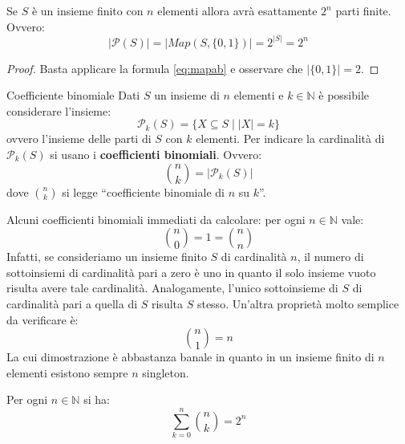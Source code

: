 \begin{corolbox}
	Se $S$ è un insieme finito con $n$ elementi allora avrà esattamente $2^{n}$ parti finite. Ovvero:
	\begin{equation}
		|\mathcal{P}(S)| = |Map(S,\{0,1\})|= 2^{|S|}=2^{n}
	\end{equation}
\end{corolbox}

\begin{proof}
	Basta applicare la formula \ref{eq:mapab} e osservare che $|\{0,1\}|=2$. 
\end{proof}

\begin{defbox}{Coefficiente binomiale}
	Dati $S$ un insieme di $n$ elementi e $k \in \mathbb{N}$ è possibile considerare l'insieme:
	\begin{equation}
		\mathcal{P}_{k}(S)= \{X \subseteq S \; | \; |X| = k\}
	\end{equation}
	ovvero l'insieme delle parti di $S$ con $k$ elementi. Per indicare la cardinalità di $\mathcal{P}_{k}(S)$ si usano i \textbf{coefficienti binomiali}. Ovvero:
	\begin{equation}
		\binom{n}{k} = |\mathcal{P}_{k}(S)|
	\end{equation}
	dove $\binom{n}{k}$ si legge ``coefficiente binomiale di $n$ su $k$''.
\end{defbox}


\begin{osservation}
	Alcuni coefficienti binomiali immediati da calcolare: per ogni $n \in \mathbb{N}$ vale:
	\begin{equation}
		\binom{n}{0} = 1 = \binom{n}{n}
	\end{equation}
	Infatti, se consideriamo un insieme finito $S$ di cardinalità $n$, il numero di sottoinsiemi di cardinalità pari a zero è uno in quanto il solo insieme vuoto risulta avere tale cardinalità. Analogamente, l'unico sottoinsieme di $S$ di cardinalità pari a quella di $S$ risulta $S$ stesso.  Un'altra proprietà molto semplice da verificare è:
	\begin{equation}
		\binom{n}{1} = n
	\end{equation}
	La cui dimostrazione è abbastanza banale in quanto in un insieme finito di $n$ elementi esistono sempre $n$ singleton.
\end{osservation}

\begin{propbox}
	Per ogni $n \in \mathbb{N}$ si ha:
	\begin{equation}
		\sum_{k=0}^{n} \binom{n}{k} = 2^{n}
	\end{equation}
\end{propbox}


